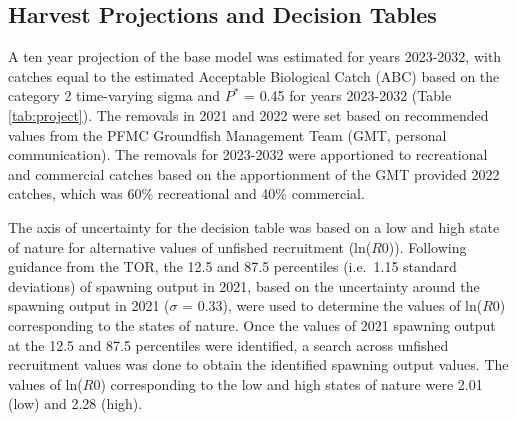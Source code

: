 \documentclass[11pt,
  english,
  a4paper,
]{article}
\begin{document}
\leavevmode\tagmcend\tagstructend\par


\hypertarget{harvest-projections-and-decision-tables}{%
\subsection{Harvest Projections and Decision Tables}\label{harvest-projections-and-decision-tables}}

\leavevmode\tagmcend\tagstructend


A ten year projection of the base model was estimated for years 2023-2032, with catches equal to the estimated Acceptable Biological Catch (ABC) based on the category 2 time-varying sigma and {\(P^*\)\leavevmode\tagmcend\tagstructend} = 0.45 for years 2023-2032 (Table \ref{tab:project}). The removals in 2021 and 2022 were set based on recommended values from the PFMC Groundfish Management Team (GMT, personal communication). The removals for 2023-2032 were apportioned to recreational and commercial catches based on the apportionment of the GMT provided 2022 catches, which was 60\% recreational and 40\% commercial.

\leavevmode\tagmcend\tagstructend\par


The axis of uncertainty for the decision table was based on a low and high state of nature for alternative values of unfished recruitment (ln({\(R0\)\leavevmode\tagmcend\tagstructend})). Following guidance from the TOR, the 12.5 and 87.5 percentiles (i.e.~1.15 standard deviations) of spawning output in 2021, based on the uncertainty around the spawning output in 2021 ({\(\sigma\)\leavevmode\tagmcend\tagstructend} = 0.33), were used to determine the values of ln({\(R0\)\leavevmode\tagmcend\tagstructend}) corresponding to the states of nature. Once the values of 2021 spawning output at the 12.5 and 87.5 percentiles were identified, a search across unfished recruitment values was done to obtain the identified spawning output values. The values of ln({\(R0\)\leavevmode\tagmcend\tagstructend}) corresponding to the low and high states of nature were 2.01 (low) and 2.28 (high).
\end{document}
